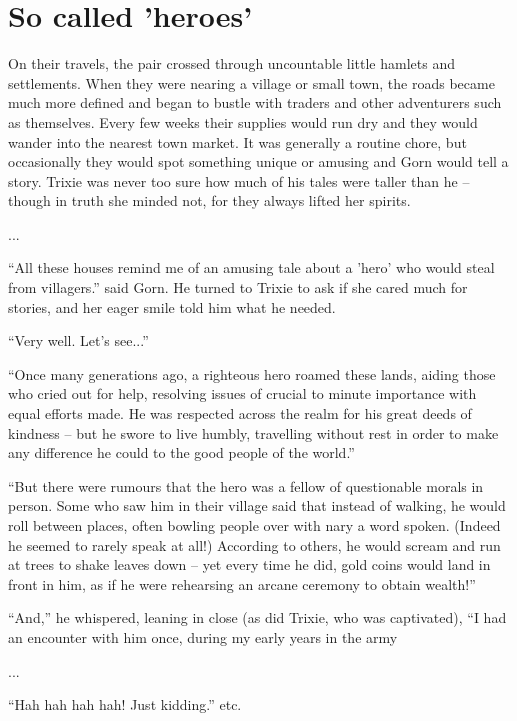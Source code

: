 
\scenesep

\section{So called 'heroes'}

On their travels, the pair crossed through uncountable little hamlets and
settlements. When they were nearing a village or small town, the roads became
much more defined and began to bustle with traders and other adventurers such as
themselves. Every few weeks their supplies would run dry and they would wander
into the nearest town market. It was generally a routine chore, but occasionally
they would spot something unique or amusing and Gorn would tell a story. Trixie
was never too sure how much of his tales were taller than he -- though in truth
she minded not, for they always lifted her spirits.

...

``All these houses remind me of an amusing tale about a 'hero' who would steal
from villagers.'' said Gorn. He turned to Trixie to ask if she cared much for
stories, and her eager smile told him what he needed.

``Very well. Let's see...''

``Once many generations ago, a righteous hero roamed these lands, aiding those
who cried out for help, resolving issues of crucial to minute importance with
equal efforts made. He was respected across the realm for his great deeds of
kindness -- but he swore to live humbly, travelling without rest in order to
make any difference he could to the good people of the world.''

``But there were rumours that the hero was a fellow of questionable morals in
person. Some who saw him in their village said that instead of walking, he would
roll between places, often bowling people over with nary a word spoken. (Indeed
he seemed to rarely speak at all!) According to others, he would scream and run
at trees to shake leaves down -- yet every time he did, gold coins would land in
front in him, as if he were rehearsing an arcane ceremony to obtain wealth!''

``And,'' he whispered, leaning in close (as did Trixie, who was captivated),
``I had an encounter with him once, during my early years in the army

...

``Hah hah hah hah! Just kidding.'' etc.
